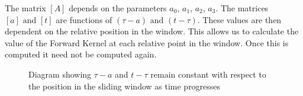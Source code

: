 \documentclass[letterpaper%
, twoside%
, 12pt%
,memoire%
, english%
,creativecommons,hyperref%
]{thETS}
\begin{document}
The matrix $[A]$ depends on the parameters $a_0$, $a_1$, $a_2$, $a_3$. The matrices $[a] \textrm{ and } [t]$ are functions of $(\tau-a) \textrm{ and } (t-\tau)$. These values are then dependent on the relative position in the window. This allows us to calculate the value of the Forward Kernel at each relative point in the window. Once this is computed it need not be computed again. 

\begin{figure}[H]
\begin{centering}
	{
		\caption{Diagram showing $\tau -a$ and $t-\tau$ remain constant with respect to the position in the sliding window as time progresses}
		\label{sliding_array}
	}
\end{centering}
\end{figure}
\end{document}
